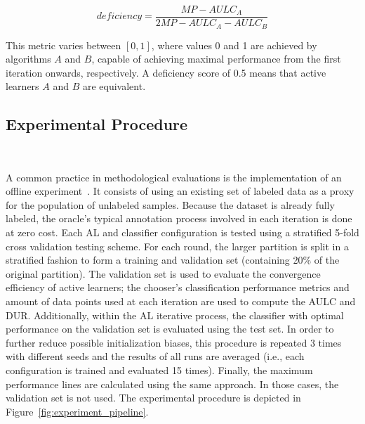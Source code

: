 \documentclass[parskip=full]{scrartcl}
\begin{document}
\begin{equation}
    deficiency = \frac{MP-AULC_A}{2MP-AULC_A-AULC_B} 
\end{equation}

This metric varies between $[0,1]$, where values 0 and 1 are achieved by
algorithms $A$ and $B$, capable of achieving maximal performance from the first
iteration onwards, respectively. A deficiency score of 0.5 means that active
learners $A$ and $B$ are equivalent.

\subsection{Experimental Procedure}~\label{sec:experimental_procedure}

A common practice in methodological evaluations is the implementation of an
offline experiment~\cite{Kagy2019}. It consists of using an existing set of
labeled data as a proxy for the population of unlabeled samples. Because the
dataset is already fully labeled, the oracle's typical annotation process
involved in each iteration is done at zero cost. Each AL and classifier
configuration is tested using a stratified 5-fold cross validation testing
scheme. For each round, the larger partition is split in a stratified fashion to
form a training and validation set (containing 20\% of the original partition).
The validation set is used to evaluate the convergence efficiency of active
learners; the chooser's classification performance metrics and amount of data
points used at each iteration are used to compute the AULC and DUR\@.
Additionally, within the AL iterative process, the classifier with optimal
performance on the validation set is evaluated using the test set. In order to
further reduce possible initialization biases, this procedure is repeated 3
times with different seeds and the results of all runs are averaged (i.e., each
configuration is trained and evaluated 15 times). Finally, the maximum
performance lines are calculated using the same approach. In those cases, the
validation set is not used. The experimental procedure is depicted in
Figure~\ref{fig:experiment_pipeline}.
\end{document}
